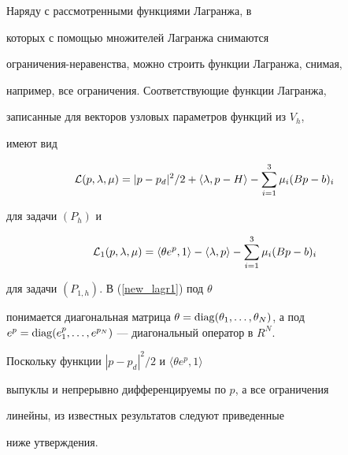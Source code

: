 \begin{note}


Наряду с рассмотренными функциями Лагранжа, в


которых с помощью множителей Лагранжа снимаются


ограничения-неравенства, можно строить функции Лагранжа, снимая,


например, все ограничения. Соответствующие функции Лагранжа,


записанные для векторов узловых параметров функций из $V_h$,


имеют вид


\begin{equation}\label{new_lagr}


{\cal L}(p,\lambda,\mu)=|p-p_{d}|^2/2+\langle\lambda,


p-H\rangle-\sum\limits_{i=1}^{3}\mu_i (Bp-b)_i


\end{equation}


для задачи $(P_h)$ и


\begin{equation}\label{new_lagr1}


{\cal L}_1(p,\lambda,\mu)=\langle\theta e^p,1\rangle


-\langle\lambda, p\rangle-\sum\limits_{i=1}^{3}\mu_i (Bp-b)_i


\end{equation}


для задачи $(P_{1,h})$. В (\ref{new_lagr1}) под $\theta$


понимается диагональная матрица $\theta=\diag


(\theta_1,\dotsc,\theta_N)$, а под $e^p=\diag


(e^p_1,\dotsc,e^{p_N})$ --- диагональный оператор в $R^N$.


\end{note}





Поскольку функции $|p-p_{d}|^2/2$ и $\langle\theta e^p,1\rangle$


выпуклы и непрерывно дифференцируемы по $p$, а все ограничения


линейны, из известных результатов \cite{Bert} следуют приведенные


ниже утверждения.





